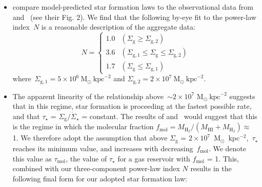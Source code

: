 \documentclass[fleqn, usenatbib]{mnras}
\newcommand{\msun}{\ensuremath{\text{M}_\odot}}
\newcommand{\persqkpc}{\ensuremath{\text{kpc}^{-2}}}
\begin{document}
\begin{itemize}
	\item \citet{Krumholz2018} compare model-predicted star formation laws to 
	the observational data from~\citet{Bigiel2010} and~\citet{Leroy2013} (see 
	their Fig. 2). We find that the following by-eye fit to the power-law 
	index~$N$ is a reasonable description of the aggregate data: 
	\begin{equation} 
	N = \begin{cases} 
	1.0 & (\Sigma_\text{g} \geq \Sigma_{\text{g},2}) 
	\\ 
	3.6 & (\Sigma_{\text{g},1} \leq \Sigma_\text{g} \leq \Sigma_{\text{g},2}) 
	\\ 
	1.7 & (\Sigma_\text{g} \leq \Sigma_{\text{g},1})  
	\end{cases} 
	\label{eq:ks_law_indeces}  
	\end{equation} 
	where~$\Sigma_{\text{g},1} = 5\times10^6~\msun~\persqkpc$ and 
	$\Sigma_{\text{g},2} = 2\times10^7~\msun~\persqkpc$.  

	\item The apparent linearity of the relationship above~$\sim2\times10^7$ 
	$\msun~\persqkpc$ suggests that in this regime, star formation is 
	proceeding at the fastest possible rate, and that $\tau_\star$ = 
	$\Sigma_\text{g}/\dot{\Sigma}_\star$ = constant. The results of 
	\citet{Leroy2008, Leroy2013} and~\citet{Kennicutt2020} would suggest that 
	this is the regime in which the molecular fraction 
	$f_\text{mol} = M_{\text{H}_2} / (M_\text{HI} + M_{\text{H}_2}) \approx$ 1. 
	We therefore adopt the assumption that above $\Sigma_\text{g}$ = 
	$2\times10^7$~M$_\odot$~kpc$^{-2}$,~$\tau_\star$ reaches its minimum value, 
	and increases with decreasing~$f_\text{mol}$. We denote this value as 
	$\tau_\text{mol}$, the value of $\tau_\star$ for a gas reservoir with 
	$f_\text{mol}$ = 1. This, combined with our three-component power-law index 
	$N$ results in the following final form for our adopted star formation 
	law: 


\end{itemize}
\end{document}
